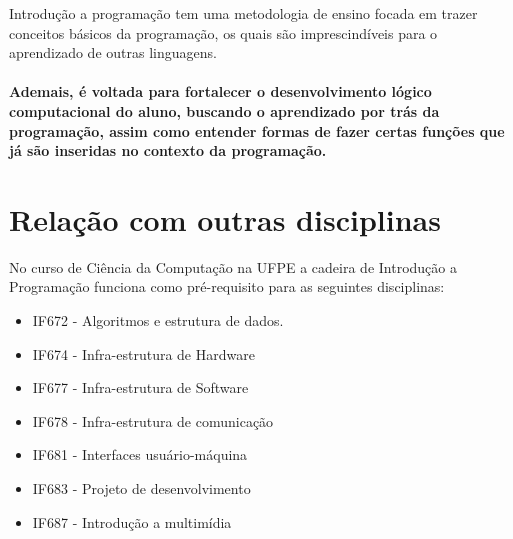 \documentclass{article}
\begin{document}
\hspace{0.5in}Introdução a programação tem uma metodologia de ensino focada em trazer conceitos básicos da programação, os quais são imprescindíveis para o aprendizado de outras linguagens. 

\paragraph{\hspace {0,5in}Ademais, é voltada para fortalecer o desenvolvimento lógico computacional do aluno, buscando o aprendizado por trás da programação, assim como entender formas de fazer certas funções que já são inseridas no contexto da programação.}

\section{Relação com outras disciplinas}

No curso de Ciência da Computação na UFPE a cadeira de Introdução a Programação funciona como pré-requisito para as seguintes disciplinas:

\begin{itemize}
  \item IF672 - Algoritmos e estrutura de dados.
  \item IF674 - Infra-estrutura de Hardware
  \item IF677 - Infra-estrutura de Software
  \item IF678 - Infra-estrutura de comunicação
  \item IF681 - Interfaces usuário-máquina
  \item IF683 - Projeto de desenvolvimento
  \item IF687 - Introdução a multimídia
\end{itemize}

\cite{livro1}
\cite{site}
\cite{livro2}



\end{document}
